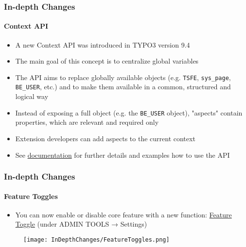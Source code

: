 
\begin{frame}[fragile]
	\frametitle{In-depth Changes}
	\framesubtitle{Context API}

	\begin{itemize}
		\item A new Context API was introduced in TYPO3 version 9.4
		\item The main goal of this concept is to centralize global variables
		\item The API aims to replace globally available objects (e.g.
			\texttt{TSFE}, \texttt{sys\_page}, \texttt{BE\_USER}, etc.) and to
			make them available in a common, structured and logical way
		\item Instead of exposing a full object (e.g. the \texttt{BE\_USER}
			object), "aspects" contain properties, which are relevant and
			required only
		\item Extension developers can add aspects to the current context
		\item See \href{https://docs.typo3.org/typo3cms/extensions/core/latest/Changelog/9.4/Feature-85389-ContextAPIForConsistentDataHandling.html}{documentation}
			for further details and examples how to use the API
	\end{itemize}

\end{frame}


\begin{frame}[fragile]
	\frametitle{In-depth Changes}
	\framesubtitle{Feature Toggles}

	\begin{itemize}
		\item You can now enable or disable core feature with a new function:
			\href{https://docs.typo3.org/typo3cms/CoreApiReference/ApiOverview/FeatureToggles/}{Feature Toggle}
			(under ADMIN TOOLS → Settings)
	\end{itemize}

	\begin{figure}
		\texttt{[image: InDepthChanges/FeatureToggles.png]}
	\end{figure}

\end{frame}


